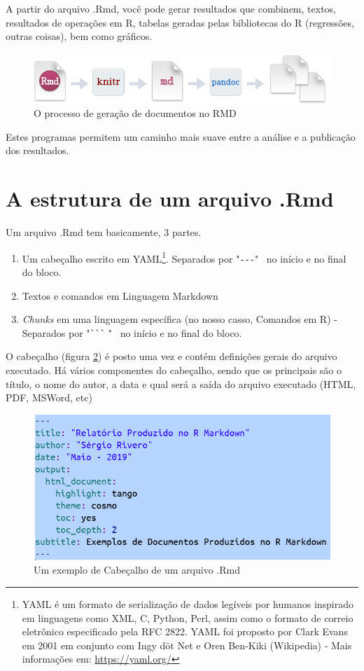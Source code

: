 \documentclass[12pt,a4paper,oneside]{erdc}
\begin{document}
	
	A partir do arquivo .Rmd, você pode gerar resultados que combinem, textos, resultados de operações em R, tabelas geradas pelas bibliotecas do R (regressões, outras coisas), bem como gráficos. 
		\begin{figure}
		\centering
		\includegraphics[width=\linewidth]{../figs/BP_Curso_TecComp_00_2019_f04-01}
		\caption{O processo de geração de documentos no RMD}
		\label{fig:bpcursoteccomp002019f04-01}
	\end{figure}
	

	Estes programas permitem um caminho mais suave entre a análise e a publicação dos resultados.

	
	
	\section{A estrutura de um arquivo .Rmd}
	
	Um arquivo .Rmd tem basicamente, 3 partes.

	\begin{enumerate}
		\item 	Um cabeçalho escrito em YAML\footnote{YAML é um formato de serialização de dados legíveis por humanos inspirado em linguagens como XML, C, Python, Perl, assim como o formato de correio eletrônico especificado pela RFC 2822. YAML foi proposto por Clark Evans em 2001 em conjunto com Ingy döt Net e Oren Ben-Kiki (Wikipedia) - Mais informações em: \url{https://yaml.org/}}. Separados por "\verb|---|" ~no início e no final do bloco.
		\item Textos e comandos em Linguagem Markdown
		\item \textit{Chunks} em uma linguagem específica (no nosso casso, Comandos em R) - Separados por  "\verb|```|  " ~no início e no final do bloco.
	\end{enumerate}	 
	
	O cabeçalho (figura \ref{fig:bpcursoteccomp002019f04-04}) é posto uma vez e contém definições gerais do arquivo executado.  Há vários componentes do cabeçalho, sendo que os principais são o título, o nome do autor, a data e qual será a saída do arquivo executado (HTML, PDF, MSWord, etc)
	
	\begin{figure}
		\centering
		\includegraphics[width=0.7\linewidth]{../figs/BP_Curso_TecComp_00_2019_f04-04}
		\caption{Um exemplo de Cabeçalho de um arquivo .Rmd}
		\label{fig:bpcursoteccomp002019f04-04}
	\end{figure}
	
\end{document}
